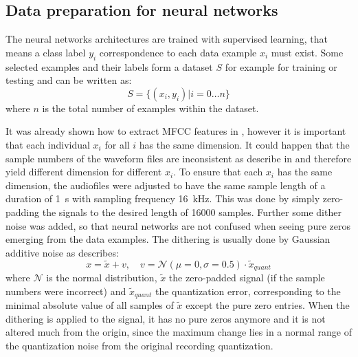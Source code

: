 
\subsection{Data preparation for neural networks}\label{sec:exp_data_prep}
The neural networks architectures are trained with supervised learning, that means a class label $y_i$ correspondence to each data example $x_i$ must exist.
Some selected examples and their labels form a dataset $S$ for example for training or testing and can be written as:
\begin{equation}\label{eq:exp_dataset}
  S = \{ (x_i, y_i) | i = 0 \dots n \}
\end{equation}
where $n$ is the total number of examples within the dataset.

It was already shown how to extract MFCC features in , however it is important that each individual $x_i$ for all $i$ has the same dimension.
It could happen that the sample numbers of the waveform files are inconsistent as describe in  and therefore yield different dimension for different $x_i$.
To ensure that each $x_i$ has the same dimension, the audiofiles were adjusted to have the same sample length of a duration of \SI{1}{\second} with sampling frequency \SI{16}{\kilo\hertz}.
This was done by simply zero-padding the signals to the desired length of 16000 samples.
Further some dither noise was added, so that neural networks are not confused when seeing pure zeros emerging from the data examples.
The dithering is usually done by Gaussian additive noise as describes:
\begin{equation}\label{eq:exp_dither}
  x = \tilde{x} + v, \quad v = \mathcal{N}(\mu=0, \sigma=0.5) \cdot \tilde{x}_{quant}%
\end{equation}
where $\mathcal{N}$ is the normal distribution, $\tilde{x}$ the zero-padded signal (if the sample numbers were incorrect) and $\tilde{x}_{quant}$ the quantization error, corresponding to the minimal absolute value of all samples of $\tilde{x}$ except the pure zero entries.
When the dithering is applied to the signal, it has no pure zeros anymore and it is not altered much from the origin, since the maximum change lies in a normal range of the quantization noise from the original recording quantization.